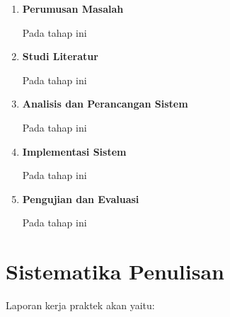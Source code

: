 \begin{enumerate}[nolistsep]

  \item \textbf{Perumusan Masalah}
  \vspace{0.5ex}

  Pada tahap ini \lipsum[1][1-3]
  \vspace{0.5ex}

  \item \textbf{Studi Literatur}
  \vspace{0.5ex}

  Pada tahap ini \lipsum[1][1-3]
  \vspace{0.5ex}

  \item \textbf{Analisis dan Perancangan Sistem}
  \vspace{0.5ex}

  Pada tahap ini \lipsum[1][1-3]
  \vspace{0.5ex}

  \item \textbf{Implementasi Sistem}
  \vspace{0.5ex}

  Pada tahap ini \lipsum[1][1-3]
  \vspace{0.5ex}

  \item \textbf{Pengujian dan Evaluasi}
  \vspace{0.5ex}

  Pada tahap ini \lipsum[1][1-3]
  \vspace{0.5ex}

\end{enumerate}
\vspace{0.5ex}

\section{Sistematika Penulisan}
\vspace{1ex}

Laporan kerja praktek akan \lipsum[1][1] yaitu:
\vspace{0.5ex}

